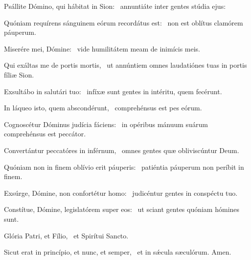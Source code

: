 \item Psállite Dómino, qui hábitat in Sion:~\psstar{} annuntiáte inter gentes stúdia ejus:
\item Quóniam requírens sánguinem eórum recordátus est:~\psstar{} non est oblítus clamórem páuperum.
\item Miserére mei, Dómine:~\psstar{} vide humilitátem meam de inimícis meis.
\item Qui exáltas me de portis mortis,~\psstar{} ut annúntiem omnes laudatiónes tuas in portis fíliæ Sion.
\item Exsultábo in salutári tuo:~\psstar{} infíxæ sunt gentes in intéritu, quem fecérunt.
\item In láqueo isto, quem abscondérunt,~\psstar{} comprehénsus est pes eórum.
\item Cognoscétur Dóminus judícia fáciens:~\psstar{} in opéribus mánuum suárum comprehénsus est peccátor.
\item Convertántur peccatóres in inférnum,~\psstar{} omnes gentes quæ obliviscúntur Deum.
\item Quóniam non in finem oblívio erit páuperis:~\psstar{} patiéntia páuperum non períbit in finem.
\item Exsúrge, Dómine, non confortétur homo:~\psstar{} judicéntur gentes in conspéctu tuo.
\item Constítue, Dómine, legislatórem super eos:~\psstar{} ut sciant gentes quóniam hómines sunt.
\item Glória Patri, et Fílio,~\psstar{} et Spirítui Sancto.
\item Sicut erat in princípio, et nunc, et semper,~\psstar{} et in sǽcula sæculórum. Amen.
